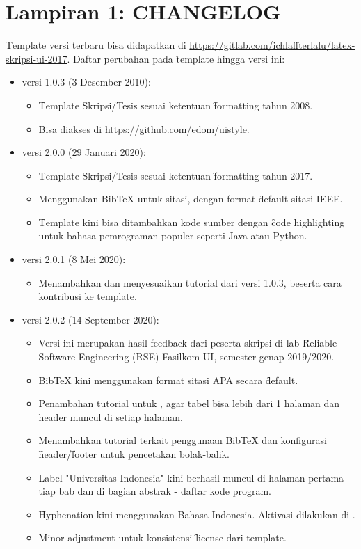 \chapter*{Lampiran 1: CHANGELOG}
\label{appendix:changelog}
\f{Template} versi terbaru bisa didapatkan di \url{https://gitlab.com/ichlaffterlalu/latex-skripsi-ui-2017}. Daftar perubahan pada \f{template} hingga versi ini:
\begin{itemize}
	\item versi 1.0.3 (3 Desember 2010):
		\begin{itemize}
			\item \f{Template} Skripsi/Tesis sesuai ketentuan \f{formatting} tahun 2008.
			\item Bisa diakses di \url{https://github.com/edom/uistyle}.
		\end{itemize}
	\item versi 2.0.0 (29 Januari 2020):
		\begin{itemize}
			\item \f{Template} Skripsi/Tesis sesuai ketentuan \f{formatting} tahun 2017.
			\item Menggunakan BibTeX untuk sitasi, dengan format \f{default} sitasi IEEE.
			\item \f{Template} kini bisa ditambahkan kode sumber dengan \f{code highlighting} untuk bahasa pemrograman populer seperti Java atau Python.
		\end{itemize}
	\item versi 2.0.1 (8 Mei 2020):
		\begin{itemize}
			\item Menambahkan dan menyesuaikan tutorial dari versi 1.0.3, beserta cara kontribusi ke template.
		\end{itemize}
	\item versi 2.0.2 (14 September 2020):
		\begin{itemize}
			\item Versi ini merupakan hasil \f{feedback} dari peserta skripsi di lab \f{Reliable Software Engineering} (RSE) Fasilkom UI, semester genap 2019/2020.
			\item BibTeX kini menggunakan format sitasi APA secara \f{default}.
			\item Penambahan tutorial untuk , agar tabel bisa lebih dari 1 halaman dan header muncul di setiap halaman.
			\item Menambahkan tutorial terkait penggunaan BibTeX dan konfigurasi \f{header}/\f{footer} untuk pencetakan bolak-balik.
			\item Label "Universitas Indonesia" kini berhasil muncul di halaman pertama tiap bab dan di bagian abstrak - daftar kode program.
			\item \f{Hyphenation} kini menggunakan  Bahasa Indonesia. Aktivasi dilakukan di .
			\item Minor adjustment untuk konsistensi \f{license} dari template.
		\end{itemize}
\end{itemize}

